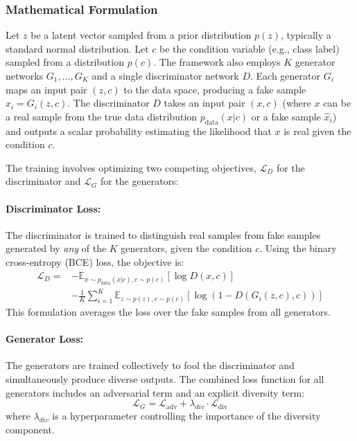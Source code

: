 \subsubsection{Mathematical Formulation}
\label{theoretical_cmadgan_math}

Let $z$ be a latent vector sampled from a prior distribution $p(z)$, typically a standard normal distribution. Let $c$ be the condition variable (e.g., class label) sampled from a distribution $p(c)$. The framework also employs $K$ generator networks $G_1, \dots, G_K$ and a single discriminator network $D$. Each generator $G_i$ maps an input pair $(z, c)$ to the data space, producing a fake sample $\hat{x}_i = G_i(z, c)$. The discriminator $D$ takes an input pair $(x, c)$ (where $x$ can be a real sample from the true data distribution $p_{\text{data}}(x|c)$ or a fake sample $\hat{x}_i$) and outputs a scalar probability estimating the likelihood that $x$ is real given the condition $c$.

The training involves optimizing two competing objectives, $\mathcal{L}_D$ for the discriminator and $\mathcal{L}_G$ for the generators:

\paragraph{Discriminator Loss:}
The discriminator is trained to distinguish real samples from fake samples generated by \textit{any} of the $K$ generators, given the condition $c$. Using the binary cross-entropy (BCE) loss, the objective is:
\begin{equation}
\label{eq:cmadgan_loss_d}
\begin{split}
\mathcal{L}_D = & - \mathbb{E}_{x \sim p_{\text{data}}(x|c), c \sim p(c)} [\log D(x, c)] \\
& - \frac{1}{K} \sum_{i=1}^{K} \mathbb{E}_{z \sim p(z), c \sim p(c)} [\log(1 - D(G_i(z, c), c))]
\end{split}
\end{equation}
This formulation averages the loss over the fake samples from all generators.

\paragraph{Generator Loss:}
The generators are trained collectively to fool the discriminator and simultaneously produce diverse outputs. The combined loss function for all generators includes an adversarial term and an explicit diversity term:
\begin{equation}
\label{eq:cmadgan_loss_g}
\mathcal{L}_G = \mathcal{L}_{\text{adv}} + \lambda_{div} \cdot \mathcal{L}_{\text{div}}
\end{equation}
where \(\lambda_{div}\) is a hyperparameter controlling the importance of the diversity component.

